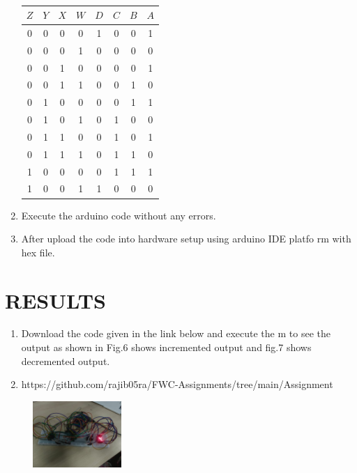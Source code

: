 \documentclass[conference]{IEEEtran}
\begin{document}
\begin{enumerate}
\begin{table}[htbp]
    \centering
\begin{tabular}
{ | c | c | c | c | c | c | c | c | } \hline
$Z$ & $Y$ & $X$ & $W$ & $D$ & $C$ & $B$ & $A$\\\hline
0   & 0   & 0   & 0   & 1  & 0 & 0  & 1 \\
0   & 0   & 0   & 1   & 0  & 0 & 0  & 0 \\
0   & 0   & 1   & 0   & 0  & 0 & 0  & 1 \\
0   & 0   & 1   & 1   & 0  & 0 & 1  & 0 \\
0   & 1   & 0   & 0   & 0  & 0 & 1  & 1 \\
0   & 1   & 0   & 1   & 0  & 1 & 0  & 0 \\
0   & 1   & 1   & 0   & 0  & 1 & 0  & 1 \\
0   & 1   & 1   & 1   & 0  & 1 & 1  & 0 \\
1   & 0   & 0   & 0   & 0  & 1 & 1  & 1 \\                              1   & 0   & 0   & 1   & 1  & 0 & 0  & 0 \\ \hline
\end{tabular}
\vspace{0.15cm}
\caption{\label{tab:widgets}}
\end{table}

\item Execute the arduino code without any errors.                      \item After upload the code into hardware setup using arduino IDE platfo
rm with hex file.
 \end{enumerate}
\section{RESULTS}
 \begin{enumerate}
         \item Download the code given in the link below and execute the
m to see the output as shown in Fig.6 shows incremented output and fig.7 shows decremented output.
         \item https://github.com/rajib05ra/FWC-Assignments/tree/main/Assignment
 \end{enumerate}
 \begin{figure}[h]
        \centering
        \includegraphics[width=0.3\textwidth]{fwc1.jpg}
        \caption{\label{fig-6:Gates}}
\end{figure}
\end{document}
